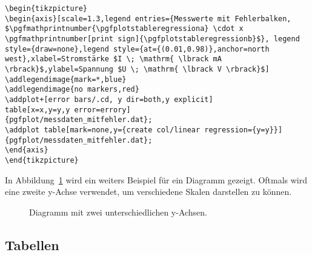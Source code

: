 \begin{lstlisting}[caption=Quellcode der Datei \textit{mess\_fehlerbalken.tex}.,label=lst:tikz]
\begin{tikzpicture}
\begin{axis}[scale=1.3,legend entries={Messwerte mit Fehlerbalken,
$\pgfmathprintnumber{\pgfplotstableregressiona} \cdot x  
\pgfmathprintnumber[print sign]{\pgfplotstableregressionb}$}, legend style={draw=none},legend style={at={(0.01,0.98)},anchor=north west},xlabel=Stromstärke $I \; \mathrm{ \lbrack mA \rbrack}$,ylabel=Spannung $U \; \mathrm{ \lbrack V \rbrack}$]
\addlegendimage{mark=*,blue}
\addlegendimage{no markers,red}
\addplot+[error bars/.cd, y dir=both,y explicit]
table[x=x,y=y,y error=errory] 
{pgfplot/messdaten_mitfehler.dat};
\addplot table[mark=none,y={create col/linear regression={y=y}}]
{pgfplot/messdaten_mitfehler.dat};
\end{axis}
\end{tikzpicture}
\end{lstlisting}

\clearpage

In Abbildung~\ref{fig:pgfplot2y} wird ein weiters Beispiel für ein Diagramm gezeigt. Oftmals wird eine zweite y-Achse verwendet, um verschiedene Skalen darstellen zu können.

\begin{figure}[hbt]
	\centering
	
	\caption[Diagramm mit zwei unterschiedlichen y-Achsen.]{Diagramm mit zwei unterschiedlichen y-Achsen.}
	\label{fig:pgfplot2y}
\end{figure}

\clearpage

\subsection{Tabellen}

